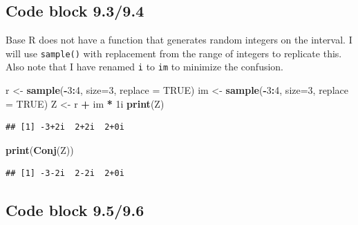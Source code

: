 \documentclass[
]{book}
\newenvironment{Shaded}{\begin{snugshade}}{\end{snugshade}}
\newcommand{\DataTypeTok}[1]{\textcolor[rgb]{0.13,0.29,0.53}{#1}}
\newcommand{\DecValTok}[1]{\textcolor[rgb]{0.00,0.00,0.81}{#1}}
\newcommand{\KeywordTok}[1]{\textcolor[rgb]{0.13,0.29,0.53}{\textbf{#1}}}
\newcommand{\NormalTok}[1]{#1}
\newcommand{\OperatorTok}[1]{\textcolor[rgb]{0.81,0.36,0.00}{\textbf{#1}}}
\newcommand{\OtherTok}[1]{\textcolor[rgb]{0.56,0.35,0.01}{#1}}
\newcommand{\StringTok}[1]{\textcolor[rgb]{0.31,0.60,0.02}{#1}}
\begin{document}
\hypertarget{code-block-9.39.4}{%
\subsection*{Code block 9.3/9.4}\label{code-block-9.39.4}}

Base R does not have a function that generates random integers on the interval. I will use \texttt{sample()} with replacement from the range of integers to replicate this. Also note that I have renamed \texttt{i} to \texttt{im} to minimize the confusion.

\begin{Shaded}
\begin{Highlighting}[]
\NormalTok{r \textless{}{-}}\StringTok{ }\KeywordTok{sample}\NormalTok{(}\OperatorTok{{-}}\DecValTok{3}\OperatorTok{:}\DecValTok{4}\NormalTok{, }\DataTypeTok{size=}\DecValTok{3}\NormalTok{, }\DataTypeTok{replace =} \OtherTok{TRUE}\NormalTok{)}
\NormalTok{im \textless{}{-}}\StringTok{ }\KeywordTok{sample}\NormalTok{(}\OperatorTok{{-}}\DecValTok{3}\OperatorTok{:}\DecValTok{4}\NormalTok{, }\DataTypeTok{size=}\DecValTok{3}\NormalTok{, }\DataTypeTok{replace =} \OtherTok{TRUE}\NormalTok{)}
\NormalTok{Z \textless{}{-}}\StringTok{ }\NormalTok{r }\OperatorTok{+}\StringTok{ }\NormalTok{im }\OperatorTok{*}\StringTok{ }\NormalTok{1i}
\KeywordTok{print}\NormalTok{(Z)}
\end{Highlighting}
\end{Shaded}

\begin{verbatim}
## [1] -3+2i  2+2i  2+0i
\end{verbatim}

\begin{Shaded}
\begin{Highlighting}[]
\KeywordTok{print}\NormalTok{(}\KeywordTok{Conj}\NormalTok{(Z))}
\end{Highlighting}
\end{Shaded}

\begin{verbatim}
## [1] -3-2i  2-2i  2+0i
\end{verbatim}

\hypertarget{code-block-9.59.6}{%
\subsection*{Code block 9.5/9.6}\label{code-block-9.59.6}}
\end{document}
